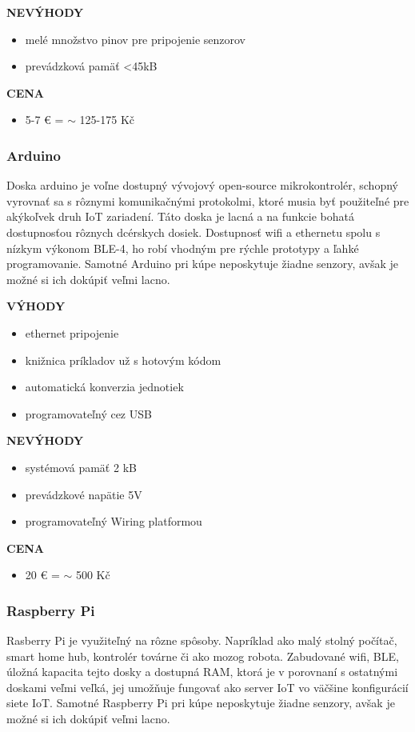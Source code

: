 \documentclass[twoside]{ctuthesis}
\theoremstyle{plain}
\theoremstyle{definition}
\theoremstyle{note}
\begin{document}
\textbf{NEVÝHODY}
\begin{itemize}
\item melé množstvo pinov pre pripojenie senzorov 
\item prevádzková pamäť <45kB
\end{itemize}

\textbf{CENA}
\begin{itemize}
\item 5-7 € = $\sim$ 125-175 Kč
\end{itemize}

\subsubsection*{Arduino}
Doska arduino je voľne dostupný vývojový open-source mikrokontrolér, schopný vyrovnať sa s rôznymi komunikačnými protokolmi, ktoré musia byť použiteľné pre akýkoľvek druh IoT zariadení. Táto doska je lacná a na funkcie bohatá dostupnosťou rôznych dcérskych dosiek. Dostupnosť wifi a ethernetu spolu s nízkym výkonom BLE-4, ho robí vhodným pre rýchle prototypy a ľahké programovanie. Samotné Arduino pri kúpe neposkytuje žiadne senzory, avšak je možné si ich dokúpiť veľmi lacno. \cite{conclusionSolution} \cite{arduino} \cite{prosconsArduino}
\newline

\textbf{VÝHODY}
\begin{itemize}
\item ethernet pripojenie
\item knižnica príkladov už s hotovým kódom
\item automatická konverzia jednotiek
\item programovateľný cez USB
\end{itemize}

\textbf{NEVÝHODY}
\begin{itemize}
\item systémová pamäť 2 kB
\item prevádzkové napätie 5V
\item programovateľný Wiring platformou
\end{itemize}

\textbf{CENA}
\begin{itemize}
\item 20 € = $\sim$ 500 Kč
\end{itemize}

\subsubsection*{Raspberry Pi}
Rasberry Pi je využiteľný na rôzne spôsoby. Napríklad ako malý stolný počítač, smart home hub, kontrolér továrne či ako mozog robota. Zabudované wifi, BLE, úložná kapacita tejto dosky a dostupná RAM, ktorá je v porovnaní s ostatnými doskami veľmi veľká, jej umožňuje fungovať ako server IoT vo väčšine konfigurácií siete IoT. Samotné Raspberry Pi pri kúpe neposkytuje žiadne senzory, avšak je možné si ich dokúpiť veľmi lacno. \cite{conclusionSolution} \cite{raspberryPi}
\newline
\end{document}
